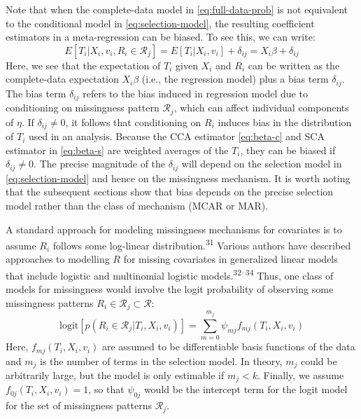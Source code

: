 \documentclass[
]{article}
\begin{document}
Note that when the complete-data model in \eqref{eq:full-data-prob} is not equivalent to the conditional model in \eqref{eq:selection-model}, the resulting coefficient estimators in a meta-regression can be biased.
To see this, we can write:
\begin{equation}
E[T_i | X_i, v_i, R_i \in \mathcal{R}_j] 
  = E[T_i | X_i, v_i] + \delta_{ij} 
  = X_i \beta + \delta_{ij}
\label{eq:bias-delta}
\end{equation}
Here, we see that the expectation of \(T_i\) given \(X_i\) and \(R_i\) can be written as the complete-data expectation \(X_i \beta\) (i.e., the regression model) plus a bias term \(\delta_{ij}\).
The bias term \(\delta_{ij}\) refers to the bias induced in regression model due to conditioning on missingness pattern \(\mathcal{R}_j\), which can affect individual components of \(\eta\).
If \(\delta_{ij} \neq 0\), it follows that conditioning on \(R_i\) induces bias in the distribution of \(T_i\) used in an analysis.
Because the CCA estimator \eqref{eq:beta-c} and SCA estimator in \eqref{eq:beta-s} are weighted averages of the \(T_i\), they can be biased if \(\delta_{ij} \neq 0\).
The precise magnitude of the \(\delta_{ij}\) will depend on the selection model in \eqref{eq:selection-model} and hence on the missingness mechanism.
It is worth noting that the subsequent sections show that bias depends on the precise selection model rather than the class of mechanism (MCAR or MAR).

A standard approach for modeling missingness mechanisms for covariates is to assume \(R_i\) follows some log-linear distribution.\textsuperscript{31}
Various authors have described approaches to modelling \(R\) for missing covariates in generalized linear models that include logistic and multinomial logistic models.\textsuperscript{32--34}
Thus, one class of models for missingness would involve the logit probability of observing some missingness patterns \(R_i \in \mathcal{R}_j \subset \mathcal{R}\):
\begin{equation}
\text{logit}[p(R_i \in \mathcal{R}_j | T_i, X_i, v_i)] = \sum_{m = 0}^{m_j} \psi_{mj} f_{mj}(T_i, X_i, v_i) 
\label{eq:r-loglinear}
\end{equation}
Here, \(f_{mj}(T_i, X_i, v_i)\) are assumed to be differentiable basis functions of the data and \(m_j\) is the number of terms in the selection model.
In theory, \(m_j\) could be arbitrarily large, but the model is only estimable if \(m_j < k\).
Finally, we assume \(f_{0j}(T_i, X_i, v_i) = 1\), so that \(\psi_{0j}\) would be the intercept term for the logit model for the set of missingness patterns \(\mathcal{R}_j\).
\end{document}
